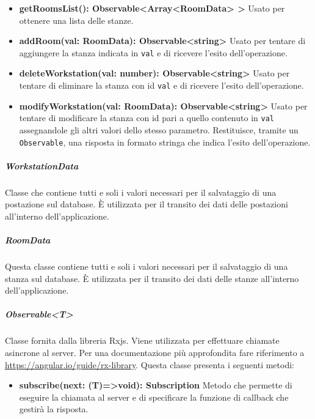 \begin{itemize}
	\item \textbf{getRoomsList(): Observable<Array<RoomData> > 	} \newline
	Usato per ottenere una lista delle stanze.
	\item \textbf{addRoom(val: RoomData): Observable<string> 	} \newline
	Usato per tentare di aggiungere la stanza indicata in \texttt{val} e di ricevere l'esito dell'operazione.
	\item \textbf{deleteWorkstation(val: number): Observable<string> 	} \newline
	Usato per tentare di eliminare la stanza con id \texttt{val} e di ricevere l'esito dell'operazione.
	\item \textbf{modifyWorkstation(val: RoomData): Observable<string>} \newline
	Usato per tentare di modificare la stanza con id pari a quello contenuto in \texttt{val} assegnandole gli altri valori dello stesso parametro. Restituisce, tramite un \texttt{Observable}, una risposta in formato stringa che indica l'esito dell'operazione.
\end{itemize}
\subparagraph{WorkstationData}
Classe che contiene tutti e soli i valori necessari per il salvataggio di una postazione sul database. È utilizzata per il transito dei dati delle postazioni all'interno dell'applicazione. \newline
\subparagraph{RoomData}
Questa classe contiene tutti e soli i valori necessari per il salvataggio di una stanza sul database. È utilizzata per il transito dei dati delle stanze all'interno dell'applicazione. \newline
\subparagraph{Observable<T>}
Classe fornita dalla libreria Rxjs. Viene utilizzata per effettuare chiamate asincrone al server. Per una documentazione più approfondita fare riferimento a \url{https://angular.io/guide/rx-library}. \newline
Questa classe presenta i seguenti metodi:
\begin{itemize}
	\item \textbf{subscribe(next: (T)=>void): Subscription} \newline
	Metodo che permette di eseguire la chiamata al server e di specificare la funzione di callback che gestirà la risposta.
\end{itemize}

